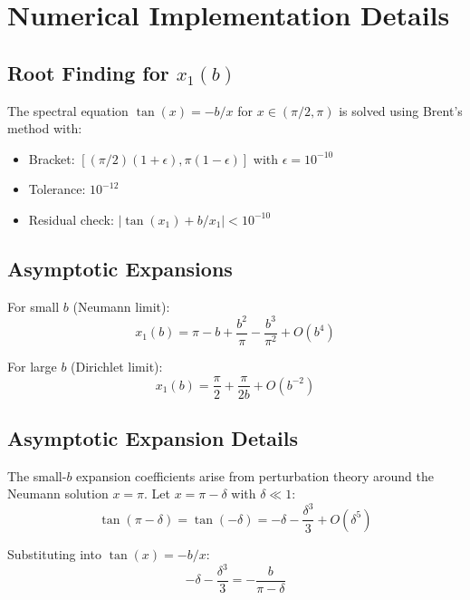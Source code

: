 \documentclass[11pt,a4paper]{article}
\begin{document}
\section{Numerical Implementation Details}
\label{app:numerics}

\subsection{Root Finding for $x_1(b)$}

The spectral equation $\tan(x) = -b/x$ for $x \in (\pi/2, \pi)$ is solved using
Brent's method with:
\begin{itemize}
  \item Bracket: $[(\pi/2)(1 + \epsilon), \pi(1 - \epsilon)]$ with $\epsilon = 10^{-10}$
  \item Tolerance: $10^{-12}$
  \item Residual check: $|\tan(x_1) + b/x_1| < 10^{-10}$
\end{itemize}

\subsection{Asymptotic Expansions}

For small $b$ (Neumann limit):
\begin{equation}
  x_1(b) = \pi - b + \frac{b^2}{\pi} - \frac{b^3}{\pi^2} + O(b^4)
  \label{eq:x1-small-b}
\end{equation}

For large $b$ (Dirichlet limit):
\begin{equation}
  x_1(b) = \frac{\pi}{2} + \frac{\pi}{2b} + O(b^{-2})
  \label{eq:x1-large-b}
\end{equation}

\subsection{Asymptotic Expansion Details}

The small-$b$ expansion coefficients arise from perturbation theory around the
Neumann solution $x = \pi$. Let $x = \pi - \delta$ with $\delta \ll 1$:
\begin{equation}
  \tan(\pi - \delta) = \tan(-\delta) = -\delta - \frac{\delta^3}{3} + O(\delta^5)
  \label{eq:tan-expansion}
\end{equation}

Substituting into $\tan(x) = -b/x$:
\begin{equation}
  -\delta - \frac{\delta^3}{3} = -\frac{b}{\pi - \delta}
  \label{eq:expansion-sub}
\end{equation}
\end{document}
